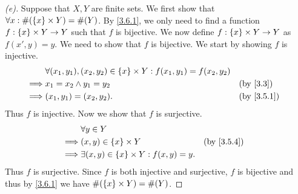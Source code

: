 \begin{proof}[(e)]
	Suppose that \(X, Y\) are finite sets.
	We first show that \(\forall x : \#(\left\lbrace x\right\rbrace \times Y) = \#(Y)\).
	By \cref{3.6.1}, we only need to find a function \(f : \left\lbrace x\right\rbrace \times Y \to Y\) such that \(f\) is bijective.
	We now define \(f : \left\lbrace x\right\rbrace \times Y \to Y\) as \(f(x', y) = y\).
	We need to show that \(f\) is bijective.
	We start by showing \(f\) is injective.
	\begin{align*}
		         & \forall (x_1, y_1), (x_2, y_2) \in \set{x} \times Y : f(x_1, y_1) = f(x_2, y_2)                 \\
		\implies & x_1 = x_2 \land y_1 = y_2                                                       &  & \by{3.3}   \\
		\implies & (x_1, y_1) = (x_2, y_2).                                                        &  & \by{3.5.1}
	\end{align*}
	Thus \(f\) is injective.
	Now we show that \(f\) is surjective.
	\begin{align*}
		         & \forall y \in Y                                                    \\
		\implies & (x, y) \in \set{x} \times Y                        &  & \by{3.5.4} \\
		\implies & \exists (x, y) \in \set{x} \times Y : f(x, y) = y.
	\end{align*}
	Thus \(f\) is surjective.
	Since \(f\) is both injective and surjective, \(f\) is bijective and thus by \cref{3.6.1} we have \(\#(\left\lbrace x\right\rbrace \times Y) = \#(Y)\).


\end{proof}

